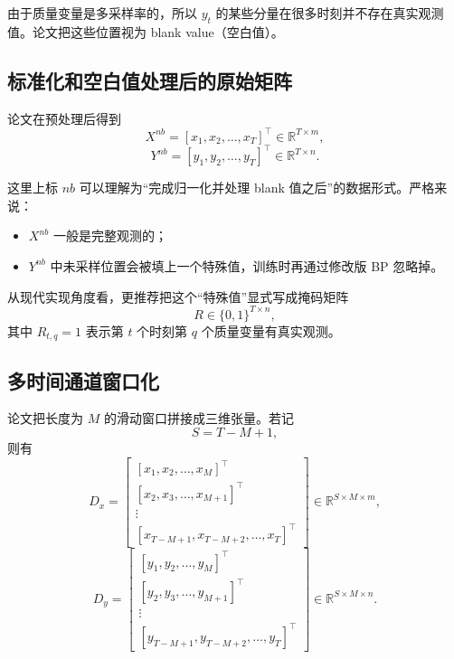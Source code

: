 \documentclass[UTF8]{ctexart}
\begin{document}
由于质量变量是多采样率的，所以 $y_t$ 的某些分量在很多时刻并不存在真实观测值。论文把这些位置视为 blank value（空白值）。

\subsection{标准化和空白值处理后的原始矩阵}

论文在预处理后得到
\begin{equation}
    X^{nb} = [x_1, x_2, \dots, x_T]^\top \in \mathbb{R}^{T \times m},
\end{equation}
\begin{equation}
    Y^{nb} = [y_1, y_2, \dots, y_T]^\top \in \mathbb{R}^{T \times n}.
\end{equation}

这里上标 $nb$ 可以理解为“完成归一化并处理 blank 值之后”的数据形式。严格来说：
\begin{itemize}
    \item $X^{nb}$ 一般是完整观测的；
    \item $Y^{nb}$ 中未采样位置会被填上一个特殊值，训练时再通过修改版 BP 忽略掉。
\end{itemize}

从现代实现角度看，更推荐把这个“特殊值”显式写成掩码矩阵
\begin{equation}
    R \in \{0,1\}^{T \times n},
\end{equation}
其中 $R_{t,q}=1$ 表示第 $t$ 个时刻第 $q$ 个质量变量有真实观测。

\subsection{多时间通道窗口化}

论文把长度为 $M$ 的滑动窗口拼接成三维张量。若记
\begin{equation}
    S = T - M + 1,
\end{equation}
则有
\begin{equation}
    D_x =
    \begin{bmatrix}
        [x_1, x_2, \dots, x_M]^\top \\
        [x_2, x_3, \dots, x_{M+1}]^\top \\
        \vdots \\
        [x_{T-M+1}, x_{T-M+2}, \dots, x_T]^\top
    \end{bmatrix}
    \in \mathbb{R}^{S \times M \times m},
\end{equation}
\begin{equation}
    D_y =
    \begin{bmatrix}
        [y_1, y_2, \dots, y_M]^\top \\
        [y_2, y_3, \dots, y_{M+1}]^\top \\
        \vdots \\
        [y_{T-M+1}, y_{T-M+2}, \dots, y_T]^\top
    \end{bmatrix}
    \in \mathbb{R}^{S \times M \times n}.
\end{equation}
\end{document}
